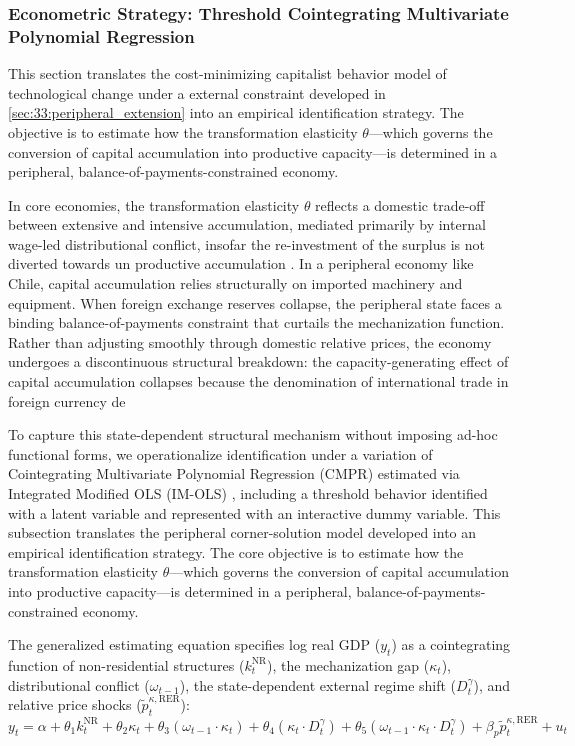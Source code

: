 



\subsubsection{Econometric Strategy: Threshold Cointegrating Multivariate Polynomial Regression}
\label{sec:441:chile_strategy}

This section translates the cost-minimizing capitalist behavior model of technological change under a external constraint developed in \cref{sec:33:peripheral_extension} into an empirical identification strategy. The objective is to estimate how the transformation elasticity $\theta$---which governs the conversion of capital accumulation into productive capacity---is determined in a peripheral, balance-of-payments-constrained economy.

In core economies, the transformation elasticity $\theta$ reflects a domestic trade-off between extensive and intensive accumulation, mediated primarily by internal wage-led distributional conflict, insofar the re-investment of the surplus is not diverted towards un productive accumulation \citep{Rotta2018}. In a peripheral economy like Chile, capital accumulation relies structurally on imported machinery and equipment. When foreign exchange reserves collapse, the peripheral state faces a binding balance-of-payments constraint that curtails the mechanization function. Rather than adjusting smoothly through domestic relative prices, the economy undergoes a discontinuous structural breakdown: the capacity-generating effect of capital accumulation collapses because the denomination of international trade in foreign currency de

To capture this state-dependent structural mechanism without imposing ad-hoc functional forms, we operationalize identification under a variation of Cointegrating Multivariate Polynomial Regression (CMPR) estimated via Integrated Modified OLS (IM-OLS) \citep{VogelsangWagner2024}, including a threshold behavior identified with a latent variable and represented with an interactive dummy variable. This subsection translates the peripheral corner-solution model developed into an empirical identification strategy. The core objective is to estimate how the transformation elasticity $\theta$---which governs the conversion of capital accumulation into productive capacity---is determined in a peripheral, balance-of-payments-constrained economy. 

The generalized estimating equation specifies log real GDP ($y_t$) as a cointegrating function of non-residential structures ($k_t^{\text{NR}}$), the mechanization gap ($\kappa_t$), distributional conflict ($\omega_{t-1}$), the state-dependent external regime shift ($D_t^{\gamma}$), and relative price shocks ($\tilde{p}_t^{\kappa, \text{RER}}$):
\begin{equation}
	y_t = \alpha + \theta_1 k_t^{\text{NR}} + \theta_2 \kappa_t + \theta_3 (\omega_{t-1} \cdot \kappa_t) + \theta_4 (\kappa_t \cdot D_t^{\gamma}) + \theta_5 (\omega_{t-1} \cdot \kappa_t \cdot D_t^{\gamma}) + \beta_p \tilde{p}_t^{\kappa, \text{RER}} + u_t
\end{equation}


